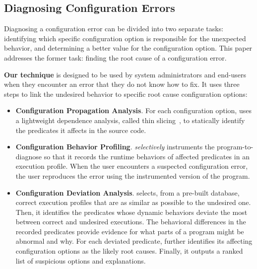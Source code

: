 
\subsection{Diagnosing Configuration Errors}

Diagnosing a configuration error can be divided into two
separate tasks: identifying which specific configuration option is
responsible for the unexpected behavior, and determining a better value for
the configuration option. This paper addresses the former task: finding
the root cause of a configuration error.


\textbf{Our technique} is designed to be used by system administrators
and end-users when they encounter an error
that they do not know how to fix. It uses three steps to 
link the undesired behavior to specific root cause configuration options:

\begin{itemize}
\item \textbf{Configuration Propagation Analysis}. For
each configuration option, \ourtool
uses a lightweight dependence analysis, called thin slicing~\cite{Sridharan:2007},
to statically identify the predicates it affects in the source code.

\item \textbf{Configuration Behavior Profiling}. \ourtool
\textit{selectively} instruments the program-to-diagnose
so that it records the runtime behaviors of affected predicates
in an execution profile.
When the user encounters a suspected configuration error, the user
reproduces the error using the instrumented version of the program.

\item \textbf{Configuration Deviation Analysis}.
\ourtool selects, from a pre-built database, correct execution profiles that are as
similar as possible to the undesired one.
Then, it identifies the predicates whose dynamic behaviors deviate the most
between correct and undesired executions.
The behavioral differences in the recorded predicates provide evidence for what parts of a program might be
abnormal and why. %
For each deviated predicate, \ourtool further identifies
its affecting configuration options as the likely root causes.
Finally, it outputs a ranked list of suspicious options and explanations.

\end{itemize}

